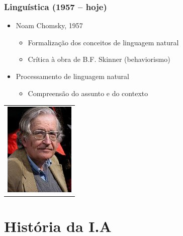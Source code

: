 \documentclass[aspectratio=169]{beamer}
\begin{document}
	\begin{frame}
		\frametitle{Linguística (1957 – hoje)}
		\begin{itemize}
			\item Noam Chomsky, 1957
			\begin{itemize}
				\item Formalização dos conceitos de linguagem natural
				\item Crítica à obra de B.F. Skinner (behaviorismo)
			\end{itemize}
			\item Processamento de linguagem natural
			\begin{itemize}
				\item Compreensão do assunto e do contexto
			\end{itemize}
		\end{itemize}
		
		\begin{table}
			\centering
			\begin{tabular}{c}				
				\includegraphics[height=4.5cm, keepaspectratio]{../figs/cap01/chomsky.jpg} \\		
				
			\end{tabular}
		\end{table}
	\end{frame}
	
	\section{História da I.A}
\end{document}
